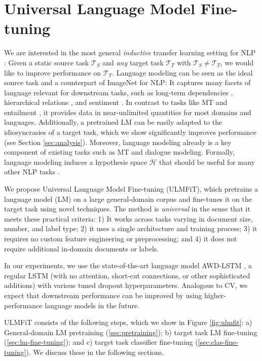 \documentclass[11pt,a4paper]{article}
\begin{document}
\section{Universal Language Model Fine-tuning}

We are interested in the most general \emph{inductive} transfer learning setting for NLP \cite{Pan2010}: Given a static source task $\mathcal{T}_S$ and \emph{any} target task $\mathcal{T}_T$ with $\mathcal{T}_S \neq \mathcal{T}_T$, we would like to improve performance on $\mathcal{T}_T$. Language modeling can be seen as the ideal source task and a counterpart of ImageNet for NLP: It captures many facets of language relevant for downstream tasks, such as long-term dependencies \cite{linzen2016assessing}, hierarchical relations \cite{Gulordava2018}, and sentiment \cite{radford2017learning}. In contrast to tasks like MT \cite{Mccann2017} and entailment \cite{Conneau2017}, it provides data in near-unlimited quantities for most domains and languages. Additionally, a pretrained LM can be easily adapted to the idiosyncrasies of a target task, which we show significantly improves performance (see Section \ref{sec:analysis}). Moreover, language modeling already is a key component of existing tasks such as MT and dialogue modeling. Formally, language modeling induces a hypothesis space $\mathcal{H}$ that should be useful for many other NLP tasks \cite{vapnik1982estimation,Baxter2000}. 

We propose Universal Language Model Fine-tuning (ULMFiT), which pretrains a language model (LM) on a large general-domain corpus and fine-tunes it on the target task using novel techniques. The method is \emph{universal} in the sense that it meets these practical criteria: 1) It works across tasks varying in document size, number, and label type; 2) it uses a single architecture and training process; 3) it requires no custom feature engineering or preprocessing; and 4) it does not require additional in-domain documents or labels.

In our experiments, we use the state-of-the-art language model AWD-LSTM \cite{Merity2017}, a regular LSTM (with no attention, short-cut connections, or other sophisticated additions) with various tuned dropout hyperparameters. Analogous to CV, we expect that downstream performance can be improved by using higher-performance language models in the future.

ULMFiT consists of the following steps, which we show in Figure \ref{fig:ulmfit}: a) General-domain LM pretraining (\textsection \ref{sec:pretraining}); b) target task LM fine-tuning (\textsection \ref{sec:lm-fine-tuning}); and c) target task classifier fine-tuning (\textsection \ref{sec:clas-fine-tuning}). We discuss these in the following sections.
\end{document}
